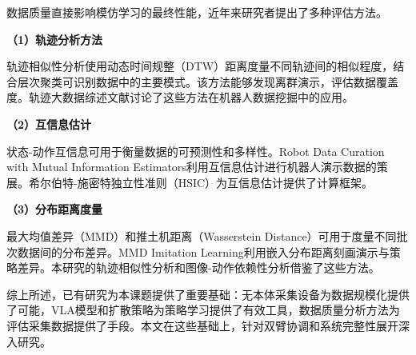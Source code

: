 数据质量直接影响模仿学习的最终性能，近年来研究者提出了多种评估方法。

\textbf{（1）轨迹分析方法}

轨迹相似性分析使用动态时间规整（DTW）距离度量不同轨迹间的相似程度，结合层次聚类可识别数据中的主要模式。该方法能够发现离群演示，评估数据覆盖度。轨迹大数据综述文献讨论了这些方法在机器人数据挖掘中的应用。

\textbf{（2）互信息估计}

状态-动作互信息可用于衡量数据的可预测性和多样性。Robot Data Curation with Mutual Information Estimators\cite{deminf2025}利用互信息估计进行机器人演示数据的策展。希尔伯特-施密特独立性准则（HSIC）为互信息估计提供了计算框架。

\textbf{（3）分布距离度量}

最大均值差异（MMD）和推土机距离（Wasserstein Distance）可用于度量不同批次数据间的分布差异。MMD Imitation Learning\cite{mmdil2013}利用嵌入分布距离刻画演示与策略差异。本研究的轨迹相似性分析和图像-动作依赖性分析借鉴了这些方法。

综上所述，已有研究为本课题提供了重要基础：无本体采集设备为数据规模化提供了可能，VLA模型和扩散策略为策略学习提供了有效工具，数据质量分析方法为评估采集数据提供了手段。本文在这些基础上，针对双臂协调和系统完整性展开深入研究。
